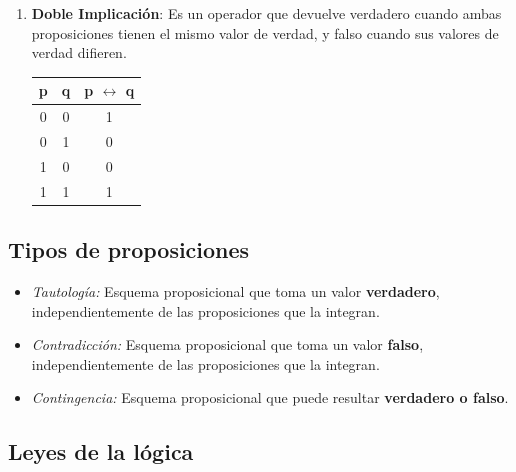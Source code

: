 \begin{enumerate}
	\item \textbf{Doble Implicación}: Es un operador que devuelve verdadero 
	cuando ambas proposiciones tienen el mismo valor de verdad, y falso cuando 
	sus valores de verdad difieren.
	\begin{center}
		\begin{tabular}{|c|c|c|}
			\hline
			\textbf{p} & \textbf{q} & \textbf{p} $\leftrightarrow$ \textbf{q}\\
			\cline{0 - 1}
			\hline
			0 & 0 & 1\\
			0 & 1 & 0\\
			1 & 0 & 0\\
			1 & 1 & 1\\
			\hline
		\end{tabular}
	\end{center}
\end{enumerate}

\subsection{Tipos de proposiciones}
\begin{itemize}
	\item \emph{Tautología:} Esquema proposicional que toma un valor 
	\textbf{verdadero}, independientemente de las proposiciones que la integran.
	
	\item \emph{Contradicción:} Esquema proposicional que toma un valor 
	\textbf{falso}, independientemente de las proposiciones que la integran.
	
	\item \emph{Contingencia:} Esquema proposicional que puede resultar 
	\textbf{verdadero o falso}.
\end{itemize}

\subsection{Leyes de la lógica}

